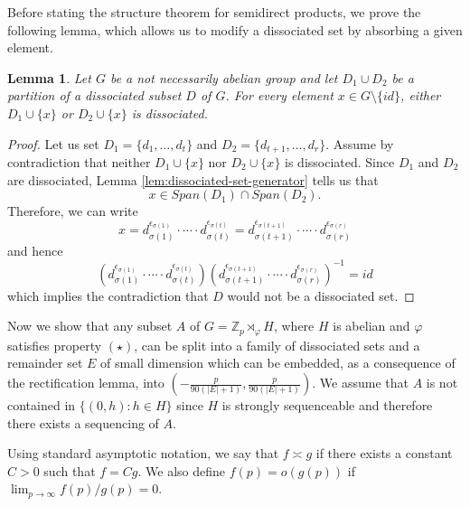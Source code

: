 \documentclass[11pt]{amsart}
\newtheorem{lemma}[theorem]{Lemma}
\theoremstyle{definition}
\begin{document}
Before stating the structure theorem for semidirect products, we prove the following lemma, which allows us to modify a dissociated set by absorbing a given element.
\begin{lemma}\label{absorptionlemma}
Let $G$ be a not necessarily abelian group and let $D_1 \cup D_2$ be a partition of a dissociated subset $D$ of $G$.  For every element $x \in G \setminus \{id\}$, either $D_1 \cup \{x\}$ or $D_2 \cup \{x\}$ is dissociated.
\end{lemma}

\begin{proof}
Let us set $D_1=\{d_1,\dots,d_t\}$ and $D_2=\{d_{t+1},\dots, d_r\}$.
Assume by contradiction that neither $D_1 \cup \{x\}$ nor $D_2 \cup \{x\}$ is dissociated.  Since $D_1$ and $D_2$ are dissociated, Lemma \ref{lem:dissociated-set-generator} tells us that
$$x\in Span(D_1)\cap Span(D_2).$$
Therefore, we can write
$$x=d_{\sigma(1)}^{\epsilon_{\sigma(1)}} \cdot \cdots \cdot d_{\sigma(t)}^ {\epsilon_{\sigma(t)}}= d_{\sigma(t+1)}^{\epsilon_{\sigma(t+1)}} \cdot \cdots \cdot d_{\sigma(r)}^ {\epsilon_{\sigma(r)}}$$
and hence
$$(d_{\sigma(1)}^{\epsilon_{\sigma(1)}} \cdot \cdots \cdot d_{\sigma(t)}^ {\epsilon_{\sigma(t)}})(d_{\sigma(t+1)}^{\epsilon_{\sigma(t+1)}} \cdot \cdots \cdot d_{\sigma(r)}^ {\epsilon_{\sigma(r)}})^{-1}=id $$
which implies the contradiction that $D$ would not be a dissociated set.
\end{proof}

Now we show that any subset $A$ of $G=\mathbb{Z}_{p} \rtimes_{\varphi} H$, where $H$ is abelian and $\varphi$ satisfies property $(\star)$, can be split into a family of dissociated sets and a remainder set $E$ of small dimension which can be embedded, as a consequence of the rectification lemma, into $\left(-\frac{p}{90(|E|+1)},\frac{p}{90(|E|+1)}\right)$. We assume that $A$ is not contained in $\{(0,h) : h\in H\}$ since $H$ is strongly sequenceable and therefore there exists a sequencing of $A$.

Using standard asymptotic notation, we say that $f \asymp g$ if there exists a constant $C > 0$ such that $f = C g$. We also define $f(p) = o(g(p))$ if $\lim_{p \to \infty} f(p) / g(p) = 0$.
\end{document}
